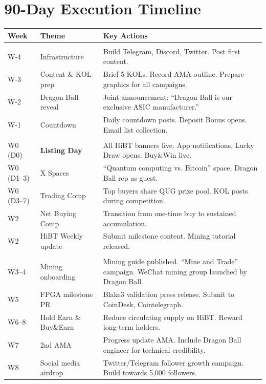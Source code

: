 \documentclass[11pt,a4paper]{article}
\begin{document}
\section{90-Day Execution Timeline}

\begin{center}
\begin{longtable}{C{2cm} L{4cm} L{7cm}}
  \toprule
  \textbf{Week} & \textbf{Theme} & \textbf{Key Actions} \\
  \midrule
  \endhead
  \bottomrule
  \endfoot

   \\

  W-4 & Infrastructure & Build Telegram, Discord, Twitter. Post first content. \\
  W-3 & Content \& KOL prep & Brief 5 KOLs. Record AMA outline. Prepare graphics for all campaigns. \\
  W-2 & Dragon Ball reveal & Joint announcement: ``Dragon Ball is our exclusive ASIC manufacturer.'' \\
  W-1 & Countdown & Daily countdown posts. Deposit Bonus opens. Email list collection. \\

   \\

  W0 (D0) & \textbf{Listing Day} & All HiBT banners live. App notifications. Lucky Draw opens. Buy\&Win live. \\
  W0 (D1--3) & X Spaces & ``Quantum computing vs. Bitcoin'' space. Dragon Ball rep as guest. \\
  W0 (D3--7) & Trading Comp & Top buyers share QUG prize pool. KOL posts during competition. \\
  W2 & Net Buying Comp & Transition from one-time buy to sustained accumulation. \\
  W2 & HiBT Weekly update & Submit milestone content. Mining tutorial released. \\

   \\

  W3--4 & Mining onboarding & Mining guide published. ``Mine and Trade'' campaign. WeChat mining group launched by Dragon Ball. \\
  W5 & FPGA milestone PR & Blake3 validation press release. Submit to CoinDesk, Cointelegraph. \\
  W6--8 & Hold Earn \& Buy\&Earn & Reduce circulating supply on HiBT. Reward long-term holders. \\
  W7 & 2nd AMA & Progress update AMA. Include Dragon Ball engineer for technical credibility. \\
  W8 & Social media airdrop & Twitter/Telegram follower growth campaign. Build towards 5,000 followers. \\


\end{longtable}
\end{center}
\end{document}
